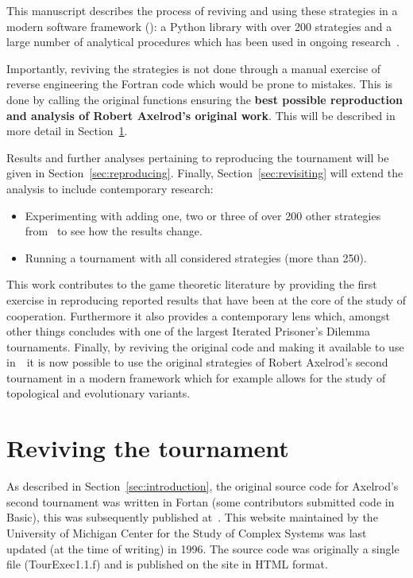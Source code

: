 \documentclass{article}
\begin{document}
This manuscript describes the process of reviving and using these strategies in
a modern software framework (\cite{AxelrodProject}): a Python library with over
200 strategies and a large number of analytical procedures which has been used
in ongoing research~\cite{Harper2017, Knight2017, glynatsi2024properties,
bucciarelli2024studying, macmillan2024game}.

Importantly, reviving the strategies is not done
through a manual exercise of reverse engineering the Fortran code which would be
prone to mistakes. This is done by calling the original functions ensuring the
\textbf{best possible reproduction and analysis of Robert Axelrod's original
work}. This will be described in more detail in Section~\ref{sec:reviving}.

Results and further analyses pertaining to reproducing the tournament will be
given in Section~\ref{sec:reproducing}. Finally, Section~\ref{sec:revisiting}
will extend the analysis to include contemporary research:

\begin{itemize}
    \item Experimenting with adding one, two or three of over 200 other strategies
        from~\cite{AxelrodProject} to see how the results change.
    \item Running a tournament with all considered strategies (more than 250).
\end{itemize}

This work contributes to the game theoretic literature by providing the first
exercise in reproducing reported results that have been at the core of the study
of cooperation. Furthermore it also provides a contemporary lens which, amongst
other things concludes with one of the largest Iterated Prisoner's Dilemma
tournaments.
Finally, by reviving the original code and making it available to use
in~\cite{AxelrodProject}~it is now possible to use the original strategies of
Robert Axelrod's second tournament in a modern framework which for example
allows for the study of topological and evolutionary variants.

\section{Reviving the tournament}\label{sec:reviving}

As described in Section~\ref{sec:introduction}, the original source code for
Axelrod's second tournament was written in Fortan (some contributors submitted
code in Basic), this was subsequently published at~\cite{Axelrod1980bCode}. This
website maintained by the University of Michigan Center for the Study of Complex
Systems was last updated (at the time of writing) in 1996. The source code was
originally a single file (TourExec1.1.f) and is published on the site in HTML format.
\end{document}
